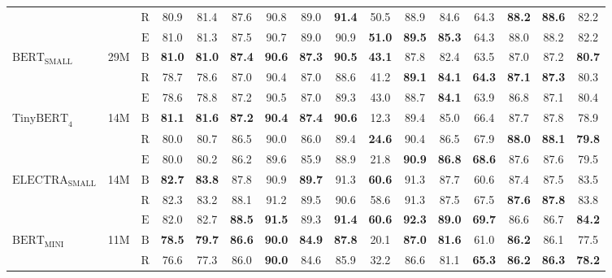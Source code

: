 \documentclass[11pt]{article}
\begin{document}
\begin{table}[tb!]
{\begin{tabular}{lccccccccccccccc}
 &  & $\text{R}$ & 80.9 & 81.4 & 87.6 & 90.8 & 89.0 & \textbf{91.4} & 50.5 & 88.9 & 84.6 & 64.3 & \textbf{88.2} & \textbf{88.6} & 82.2 \\
 &  & $\text{E}$ & 81.0 & 81.3 & 87.5 & 90.7 & 89.0 & 90.9 & \textbf{51.0} & \textbf{89.5} & \textbf{85.3} & 64.3 & 88.0 & 88.2 & 82.2 \\ \hline
$\text{BERT}_{\text{SMALL}}$ & 29M & $\text{B}$ & \textbf{81.0} & \textbf{81.0} & \textbf{87.4} & \textbf{90.6} & \textbf{87.3} & \textbf{90.5} & \textbf{43.1} & 87.8 & 82.4 & 63.5 & 87.0 & 87.2 & \textbf{80.7} \\
 &  & $\text{R}$ & 78.7 & 78.6 & 87.0 & 90.4 & 87.0 & 88.6 & 41.2 & \textbf{89.1} & \textbf{84.1} & \textbf{64.3} & \textbf{87.1} & \textbf{87.3} & 80.3 \\
 &  & $\text{E}$ & 78.6 & 78.8 & 87.2 & 90.5 & 87.0 & 89.3 & 43.0 & 88.7 & \textbf{84.1} & 63.9 & 86.8 & 87.1 & 80.4 \\ \hline
$\text{TinyBERT}_{\text{4}}$ & 14M & $\text{B}$ & \textbf{81.1} & \textbf{81.6} & \textbf{87.2} & \textbf{90.4} & \textbf{87.4} & \textbf{90.6} & 12.3 & 89.4 & 85.0 & 66.4 & 87.7 & 87.8 & 78.9 \\
 &  & $\text{R}$ & 80.0 & 80.7 & 86.5 & 90.0 & 86.0 & 89.4 & \textbf{24.6} & 90.4 & 86.5 & 67.9 & \textbf{88.0} & \textbf{88.1} & \textbf{79.8} \\
 &  & $\text{E}$ & 80.0 & 80.2 & 86.2 & 89.6 & 85.9 & 88.9 & 21.8 & \textbf{90.9} & \textbf{86.8} & \textbf{68.6} & 87.6 & 87.6 & 79.5 \\ \hline
$\text{ELECTRA}_{\text{SMALL}}$ & 14M & $\text{B}$ & \textbf{82.7} & \textbf{83.8} & 87.8 & 90.9 & \textbf{89.7} & 91.3 & \textbf{60.6} & 91.3 & 87.7 & 60.6 & 87.4 & 87.5 & 83.5 \\
 &  & $\text{R}$ & 82.3 & 83.2 & 88.1 & 91.2 & 89.5 & 90.6 & 58.6 & 91.3 & 87.5 & 67.5 & \textbf{87.6} & \textbf{87.8} & 83.8 \\
 &  & $\text{E}$ & 82.0 & 82.7 & \textbf{88.5} & \textbf{91.5} & 89.3 & \textbf{91.4} & \textbf{60.6} & \textbf{92.3} & \textbf{89.0} & \textbf{69.7} & 86.6 & 86.7 & \textbf{84.2} \\ \hline
$\text{BERT}_{\text{MINI}}$ & 11M & $\text{B}$ & \textbf{78.5} & \textbf{79.7} & \textbf{86.6} & \textbf{90.0} & \textbf{84.9} & \textbf{87.8} & 20.1 & \textbf{87.0} & \textbf{81.6} & 61.0 & \textbf{86.2} & 86.1 & 77.5 \\
 &  & $\text{R}$ & 76.6 & 77.3 & 86.0 & \textbf{90.0} & 84.6 & 85.9 & 32.2 & 86.6 & 81.1 & \textbf{65.3} & \textbf{86.2} & \textbf{86.3} & \textbf{78.2} \\

\end{tabular}}
\end{table}
\end{document}

